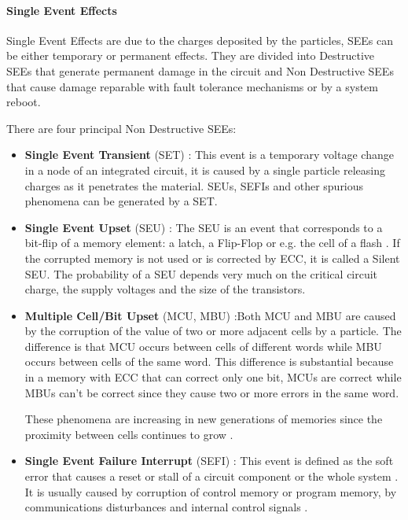{{{{{				}%
				\paragraph{Single Event Effects}{
					Single Event Effects are due to the charges deposited by the particles, SEEs can be either temporary or permanent effects. They are divided into Destructive SEEs that generate permanent damage in the circuit and Non Destructive SEEs that cause damage reparable with fault tolerance mechanisms or by a system reboot.
					
					There are four principal Non Destructive SEEs:
					\begin{itemize}
						\item \textbf{Single Event Transient} (SET) : This event is a temporary voltage change in a node of an integrated circuit, it is caused by a single particle releasing charges as it penetrates the material. SEUs, SEFIs and other spurious phenomena can be generated by a SET.
						
						\item \textbf{Single Event Upset} (SEU) : The SEU is an event that corresponds to a bit-flip of a memory element: a latch, a Flip-Flop or e.g. the cell of a flash . If the corrupted memory is not used or is corrected  by ECC, it is called a Silent SEU. The probability of a SEU depends very much on the critical circuit charge, the supply voltages and the size of the transistors.
						
						\item \textbf{Multiple Cell/Bit Upset} (MCU, MBU) :Both MCU and MBU are caused by the corruption of the value of two or more adjacent cells by a particle. The difference is that MCU occurs between cells of different words while MBU occurs between cells of the same word. This difference is substantial because in a memory with ECC that can correct only one bit, MCUs are correct while MBUs can't be correct since they cause two or more errors in the same word.
						
						These phenomena are increasing in new generations of memories since the proximity between cells continues to grow .
						
						\item \textbf{Single Event Failure Interrupt} (SEFI) : This event is defined as the soft error that causes a reset or stall of a circuit component or the whole system . It is usually caused by corruption of control memory or program memory, by communications disturbances and internal control signals .
						

\end{itemize}}}}}}
